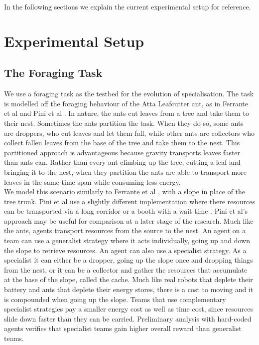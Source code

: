 \documentclass[12pt]{article}
\begin{document}
\begin{appendices}

In the following sections we explain the current experimental setup for reference.

\section{Experimental Setup}

\subsection{The Foraging Task}\label{task_description}

We use a foraging task as the testbed for the evolution of specialisation.
The task is modelled off the foraging behaviour of the Atta Leafcutter ant, as in Ferrante et al \cite{ferrante:PLOS_CB:2015} and Pini et al \cite{pini:ICSI:2012, pini:Swarm_Intelligence:2011}.
In nature, the ants cut leaves from a tree and take them to their nest. 
Sometimes the ants partition the task. 
When they do so, some ants are droppers, who cut leaves and let them fall, while other ants are collectors who collect fallen leaves from the base of the tree and take them to the nest.
This partitioned approach is advantageous because gravity transports leaves faster than ants can.
Rather than every ant climbing up the tree, cutting a leaf and bringing it to the nest, when they partition the ants are able to transport more leaves in the same time-span while consuming less energy.\\

We model this scenario similarly to Ferrante et al \cite{ferrante:PLOS_CB:2015}, with a slope in place of the tree trunk. 
Pini et al use a slightly different implementation where there resources can be transported via a long corridor or a booth with a wait time \cite{pini:ICSI:2012, pini:Swarm_Intelligence:2011}. 
Pini et al's approach may be useful for comparison at a later stage of the research.
Much like the ants, agents transport resources from the source to the nest.
An agent on a team can use a generalist strategy where it acts individually, going up and down the slope to retrieve resources.
An agent can also use a specialist strategy. 
As a specialist it can either be a dropper, going up the slope once and dropping things from the nest, or it can be a collector and gather the resources that accumulate at the base of the slope, called the cache.
Much like real robots that deplete their battery and ants that deplete their energy stores, there is a cost to moving and it is compounded when going up the slope. 
Teams that use complementary specialist strategies pay a smaller energy cost as well as time cost, since resources slide down faster than they can be carried. 
Preliminary analysis with hard-coded agents verifies that specialist teams gain higher overall reward than generalist teams.\\


\end{appendices}
\end{document}
